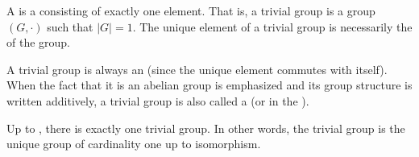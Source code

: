 \begin{definition} \label{definition:trivial_group_zero_group}
A  is a  consisting of exactly one element. That is, a trivial group is a group $(G, \cdot)$ such that $|G| = 1$. The unique element of a trivial group is necessarily the  of the group.

A trivial group is always an  (since the unique element commutes with itself). When the fact that it is an abelian group is emphasized and its group structure is written additively, a trivial group is also called a  (or  in the ).

Up to , there is exactly one trivial group. In other words, the trivial group is the unique group of cardinality one up to isomorphism.
\end{definition}